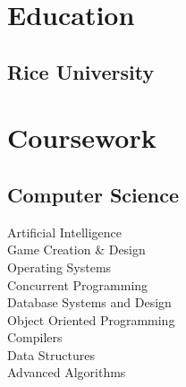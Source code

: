 \documentclass[letterpaper]{deedy-resume} %
\begin{document}

\lastupdated %



\begin{minipage}[t]{0.29\textwidth} %


\section{Education} 

\subsection{Rice University}



\section{Coursework}

\subsection{Computer Science}
\textbullet{} Artificial Intelligence\\
\textbullet{} Game Creation \& Design\\
\textbullet{} Operating Systems\\
\textbullet{} Concurrent Programming\\
\textbullet{} Database Systems and Design\\
\textbullet{} Object Oriented Programming\\
\textbullet{} Compilers\\
\textbullet{} Data Structures\\
\textbullet{} Advanced Algorithms\\


\end{minipage}
\end{document}
